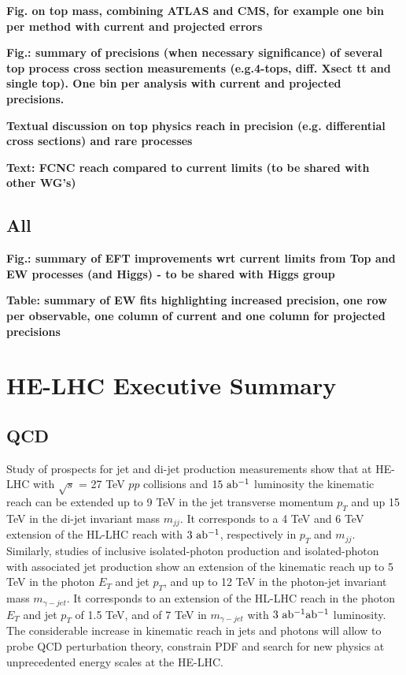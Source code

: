 \documentclass{article}
\begin{document}
{\bf Fig. on top mass, combining ATLAS and CMS, for example one bin per method with current and projected errors}

\vspace{5mm}
\noindent
{\bf Fig.: summary of precisions (when necessary significance) of several top process cross section measurements (e.g.4-tops, diff. Xsect tt and single top). One bin per analysis with current and projected precisions.}

\vspace{5mm}
\noindent
{\bf Textual discussion on top physics reach in precision (e.g. differential cross sections) and rare processes}

\vspace{5mm}
\noindent
{\bf Text: FCNC reach compared to current limits (to be shared with other WG's)}

\subsection{All}


{\bf Fig.: summary of EFT improvements wrt current limits from Top and EW processes (and Higgs) - to be shared with Higgs group}

\vspace{5mm}
\noindent
{\bf Table: summary of EW fits highlighting increased precision, one row per observable, one column of current and one column for projected precisions}



\clearpage
\section{HE-LHC Executive Summary}

\subsection{QCD}

Study of prospects for jet and di-jet production measurements show that at HE-LHC with $\sqrt{s}$ = 27 TeV $pp$ collisions and $15~ {\rm ab^{-1}}$ luminosity the kinematic reach can be extended up to 9 TeV in the jet transverse momentum $p_T$ and up 15 TeV in the di-jet invariant mass $m_{jj}$. It corresponds to a 4 TeV and 6 TeV extension of the HL-LHC reach with $3~ {\rm ab^{-1}}$, respectively in $p_T$ and $m_{jj}$. Similarly, studies of inclusive isolated-photon production and isolated-photon with associated jet production show an extension of the kinematic reach up to 5 TeV in the photon $E_T$ and jet $p_T$, and up to 12 TeV in the photon-jet invariant mass $m_{\gamma - jet}$. It corresponds to an extension of the HL-LHC reach in the photon $E_T$ and jet $p_T$ of 1.5 TeV, and of 7 TeV in $m_{\gamma - jet}$ with $3 ~{\rm ab^{-1}}{\rm ab^{-1}}$ luminosity.
The considerable increase in kinematic reach in jets and photons will allow to probe QCD perturbation theory, constrain PDF and search for new physics at unprecedented energy scales at the HE-LHC.
\end{document}
